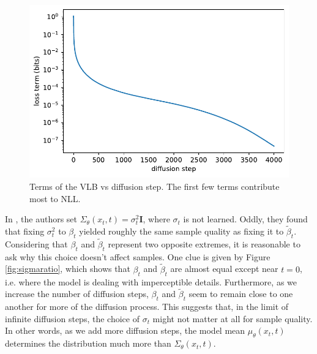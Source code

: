 \documentclass{article}
\begin{document}
\begin{figure}[ht]
\vskip 0.2in
\begin{center}
\centerline{\includegraphics[width=0.8\columnwidth]{loss_terms-eps.pdf}}
\caption{\label{fig:lossterms} Terms of the VLB vs diffusion step. The first few terms contribute most to NLL.}\end{center}
\vskip -0.4in
\end{figure}


In \citet{ddpm}, the authors set $\Sigma_{\theta}(x_t, t) = \sigma^2_t \mathbf{I}$, where $\sigma_t$ is not learned. Oddly, they found that fixing $\sigma^2_t$ to $\beta_t$ yielded roughly the same sample quality as fixing it to $\tilde{\beta}_t$. Considering that $\beta_t$ and $\tilde{\beta}_t$ represent two opposite extremes, it is reasonable to ask why this choice doesn't affect samples. One clue is given by Figure \ref{fig:sigmaratio}, which shows that $\beta_t$ and $\tilde{\beta}_t$ are almost equal except near $t = 0$, i.e. where the model is dealing with imperceptible details. Furthermore, as we increase the number of diffusion steps, $\beta_t$ and $\tilde{\beta}_t$ seem to remain close to one another for more of the diffusion process. This suggests that, in the limit of infinite diffusion steps, the choice of $\sigma_t$ might not matter at all for sample quality. In other words, as we add more diffusion steps, the model mean $\mu_{\theta}(x_t, t)$ determines the distribution much more than $\Sigma_{\theta}(x_t, t)$.
\end{document}
